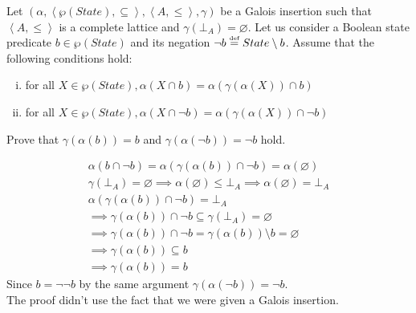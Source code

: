 \begin{exercise}{
    Let $(\alpha, \left<\wp(State), \subseteq\right>, \left<A, \leq\right>, \gamma)$ be a Galois insertion such that $\left<A, \leq\right>$ is a complete lattice and $\gamma(\bot_A) = \varnothing$. Let us consider a Boolean state predicate $b \in \wp(State)$ and its negation $\neg b \overset{\text{\tiny def}}{=} State \setminus b$. Assume that the following conditions hold:
    \begin{enumerate}[(i)]
        \item for all $X \in \wp(State), \alpha(X \cap b) = \alpha(\gamma(\alpha(X)) \cap b)$
        \item for all $X \in \wp(State), \alpha(X \cap \neg b) = \alpha(\gamma(\alpha(X)) \cap \neg b)$
    \end{enumerate}
    Prove that $\gamma(\alpha(b)) = b$ and $\gamma(\alpha(\neg b)) = \neg b$ hold.
}
    \begin{gather*}
        \alpha(b \cap \neg b) = \alpha(\gamma(\alpha(b)) \cap \neg b) = \alpha(\varnothing) \\
        \gamma(\bot_A) = \varnothing \implies \alpha(\varnothing) \leq \bot_A \implies \alpha(\varnothing) = \bot_A \\
        \alpha(\gamma(\alpha(b)) \cap \neg b) = \bot_A \\
        \implies \gamma(\alpha(b)) \cap \neg b \subseteq \gamma(\bot_A) = \varnothing \\
        \implies \gamma(\alpha(b)) \cap \neg b = \gamma(\alpha(b)) \setminus b = \varnothing \\
        \implies \gamma(\alpha(b)) \subseteq b \\
        \implies \gamma(\alpha(b)) = b
    \end{gather*}
    Since $b = \neg \neg b$ by the same argument $\gamma(\alpha(\neg b)) = \neg b$. \\
    The proof didn't use the fact that we were given a Galois insertion.
\end{exercise}
